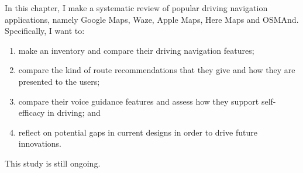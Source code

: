 In this chapter, I make a systematic review of popular driving navigation applications, namely Google Maps, Waze, Apple Maps, Here Maps and OSMAnd. Specifically, I want to:

\begin{enumerate}
\item make an inventory and compare their driving navigation features;
\item compare the kind of route recommendations that they give and how they are presented to the users;
\item compare their voice guidance features and assess how they support self-efficacy in driving; and 
\item reflect on potential gaps in current designs in order to drive future innovations.
\end{enumerate}

This study is still ongoing.